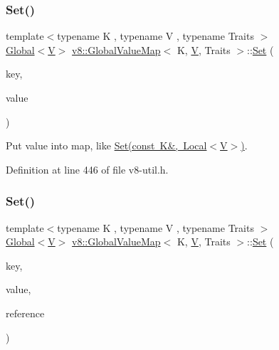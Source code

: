 \subsubsection{\texorpdfstring{Set()}{Set()}\hspace{0.1cm}{\footnotesize\ttfamily [2/3]}}
{\footnotesize\ttfamily template$<$typename K , typename V , typename Traits $>$ \\
\mbox{\hyperlink{classv8_1_1Global}{Global}}$<$\mbox{\hyperlink{classV}{V}}$>$ \mbox{\hyperlink{classv8_1_1GlobalValueMap}{v8\+::\+Global\+Value\+Map}}$<$ K, \mbox{\hyperlink{classV}{V}}, Traits $>$\+::\mbox{\hyperlink{classv8_1_1Set}{Set}} (\begin{DoxyParamCaption}\item[{const K \&}]{key,  }\item[{\mbox{\hyperlink{classv8_1_1Global}{Global}}$<$ \mbox{\hyperlink{classV}{V}} $>$}]{value }\end{DoxyParamCaption})\hspace{0.3cm}{\ttfamily [inline]}}

Put value into map, like \mbox{\hyperlink{classv8_1_1GlobalValueMap_aa13f7914642c705b8e96824747ea115a}{Set(const K\&, Local$<$\+V$>$)}}. 

Definition at line 446 of file v8-\/util.\+h.

\mbox{\label{classv8_1_1GlobalValueMap_aaa5fa26f751c8608716ad5578cd6c1d0}} 
\subsubsection{\texorpdfstring{Set()}{Set()}\hspace{0.1cm}{\footnotesize\ttfamily [3/3]}}
{\footnotesize\ttfamily template$<$typename K , typename V , typename Traits $>$ \\
\mbox{\hyperlink{classv8_1_1Global}{Global}}$<$\mbox{\hyperlink{classV}{V}}$>$ \mbox{\hyperlink{classv8_1_1GlobalValueMap}{v8\+::\+Global\+Value\+Map}}$<$ K, \mbox{\hyperlink{classV}{V}}, Traits $>$\+::\mbox{\hyperlink{classv8_1_1Set}{Set}} (\begin{DoxyParamCaption}\item[{const K \&}]{key,  }\item[{\mbox{\hyperlink{classv8_1_1Global}{Global}}$<$ \mbox{\hyperlink{classV}{V}} $>$}]{value,  }\item[{\mbox{\hyperlink{classv8_1_1PersistentValueMapBase_1_1PersistentValueReference}{Persistent\+Value\+Reference}} $\ast$}]{reference }\end{DoxyParamCaption})\hspace{0.3cm}{\ttfamily [inline]}}

